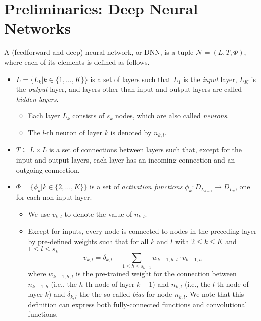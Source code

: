 \documentclass[runningheads,a4paper]{llncs}
\newcommand{\networks}{\mathcal{N}}
\begin{document}
\section{Preliminaries: Deep Neural Networks}\newcommand{\real}{\mathds{R}}

A (feedforward and deep) neural network, or DNN, is a tuple $\networks=(L,
T, \Phi)$, where each of its elements is defined as follows.

\begin{itemize}
  \item $L=\{L_k|k\in\{1,\dots,K\}\}$ is a set of layers such that
    $L_1$ is the \emph{input} layer, $L_{K}$ is the \emph{output} layer,
    and layers other than input and output layers are called \emph{hidden layers}.
    
    \begin{itemize}
      \item Each layer $L_k$ consists of $s_k$ nodes, which are
        also called \emph{neurons}.
      \item The $l$-th neuron of layer $k$ is
        denoted by $n_{k,l}$. 
    \end{itemize}


  \item $T\subseteq L\times L$ is a set of connections between layers such that, 
    except for the input and output layers, each layer has an incoming connection and an
    outgoing connection.
  \item $\Phi=\{\phi_k|k\in\{2,\dots,K\}\}$ is a set of \emph{activation functions}
    $\phi_k:D_{L_{k-1}}\rightarrow D_{L_k}$, one for each non-input layer. 

    \begin{itemize}
      \item We use $v_{k,l}$ to denote the value of $n_{k,l}$.
      \item Except for inputs, every node is connected to nodes in the preceding
        layer by pre-defined weights such that for all $k$ and $l$ with
        $2 \leq k\leq K$ and  $1\leq l\leq s_k$
%
        \begin{equation}
          \label{eq:sum}
          v_{k,l}=\delta_{k,l}+\sum_{1\leq h \leq s_{k-1}} w_{k-1, h, l}\cdot v_{k-1,h}
        \end{equation}
%
        where $w_{k-1,h,l}$ is the pre-trained weight for the connection between
        $n_{k-1,h}$ (i.e., the $h$-th node of layer $k-1$) and $n_{k,l}$
        (i.e., the $l$-th node of layer $k$) and $\delta_{k,l}$ the the
        so-called \emph{bias} for node $n_{k,l}$.  We note that this
        definition can express both fully-connected functions and
        convolutional functions.


\end{itemize}
\end{itemize}
\end{document}
